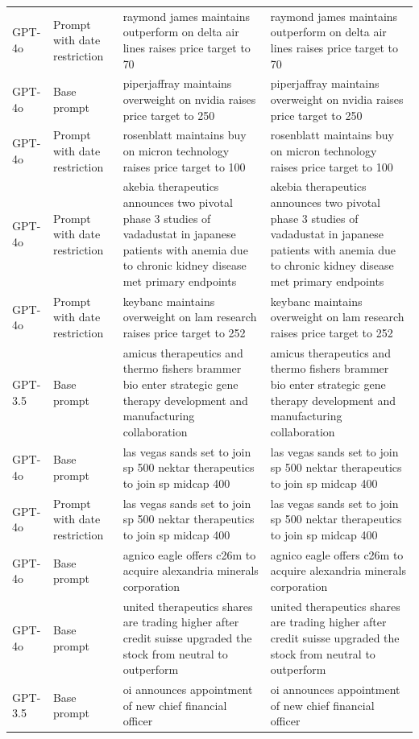 \begin{longtable}{>{\raggedright\arraybackslash}p{1.4cm}>{\raggedright\arraybackslash}p{1.4cm}>{\raggedright\arraybackslash}p{5.5cm}>{\raggedright\arraybackslash}p{5.5cm}}
GPT-4o & Prompt with date restriction & raymond james maintains outperform on delta air lines raises price target to 70 & raymond james maintains outperform on delta air lines raises price target to 70\\
GPT-4o & Base prompt & piperjaffray maintains overweight on nvidia raises price target to 250 & piperjaffray maintains overweight on nvidia raises price target to 250\\
GPT-4o & Prompt with date restriction & rosenblatt maintains buy on micron technology raises price target to 100 & rosenblatt maintains buy on micron technology raises price target to 100\\
GPT-4o & Prompt with date restriction & akebia therapeutics announces two pivotal phase 3 studies of vadadustat in japanese patients with anemia due to chronic kidney disease met primary endpoints & akebia therapeutics announces two pivotal phase 3 studies of vadadustat in japanese patients with anemia due to chronic kidney disease met primary endpoints\\
GPT-4o & Prompt with date restriction & keybanc maintains overweight on lam research raises price target to 252 & keybanc maintains overweight on lam research raises price target to 252\\
GPT-3.5 & Base prompt & amicus therapeutics and thermo fishers brammer bio enter strategic gene therapy development and manufacturing collaboration & amicus therapeutics and thermo fishers brammer bio enter strategic gene therapy development and manufacturing collaboration\\
GPT-4o & Base prompt & las vegas sands set to join sp 500 nektar therapeutics to join sp midcap 400 & las vegas sands set to join sp 500 nektar therapeutics to join sp midcap 400\\
GPT-4o & Prompt with date restriction & las vegas sands set to join sp 500 nektar therapeutics to join sp midcap 400 & las vegas sands set to join sp 500 nektar therapeutics to join sp midcap 400\\
GPT-4o & Base prompt & agnico eagle offers c26m to acquire alexandria minerals corporation & agnico eagle offers c26m to acquire alexandria minerals corporation\\
GPT-4o & Base prompt & united therapeutics shares are trading higher after credit suisse upgraded the stock from neutral to outperform & united therapeutics shares are trading higher after credit suisse upgraded the stock from neutral to outperform\\
GPT-3.5 & Base prompt & oi announces appointment of new chief financial officer & oi announces appointment of new chief financial officer\\

\end{longtable}
